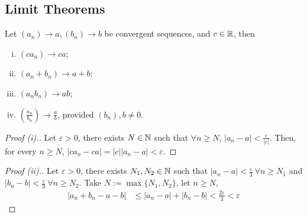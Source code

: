 \documentclass[11pt]{article}
\begin{document}
	\subsection{Limit Theorems}
	\begin{theorem}
		Let $(a_n) \to a, (b_n) \to b$ be convergent sequences, and $c \in \mathbb{R}$, then
		\begin{enumerate}[(i)]
			\item $(c a_n) \to c a$;
			\item $(a_n + b_n) \to a + b$;
			\item $(a_n b_n) \to ab$;
			\item $\left(\frac{a_n}{b_n}\right) \to \frac{a}{b}$, provided $(b_n), b \neq 0$.
		\end{enumerate}
	\end{theorem}
	\begin{proof}[Proof (i).]
		Let $\varepsilon > 0$, there exists $N \in \mathbb{N}$ such that $\forall n \geq N$, $|a_n - a| < \frac{\varepsilon}{|c|}$. Then, for every $n \geq N$, $|c a_n - ca| = |c| |a_n - a| < \varepsilon$.
	\end{proof}
	
	\begin{proof}[Proof (ii).]
		Let $\varepsilon > 0$, there exists $N_1, N_2 \in \mathbb{N}$ such that $|a_n - a| < \frac{\varepsilon}{3}\ \forall n \geq N_1$ and $|b_n - b| < \frac{\varepsilon}{3}\ \forall n \geq N_2$. Take $N := \max\{N_1, N_2\}$, let $n \geq N$,
		\begin{align}
			|a_n + b_n - a - b| &\leq |a_n - a| + |b_n - b| < \frac{2\varepsilon}{3} < \varepsilon
		\end{align}
	\end{proof}
	
\end{document}
